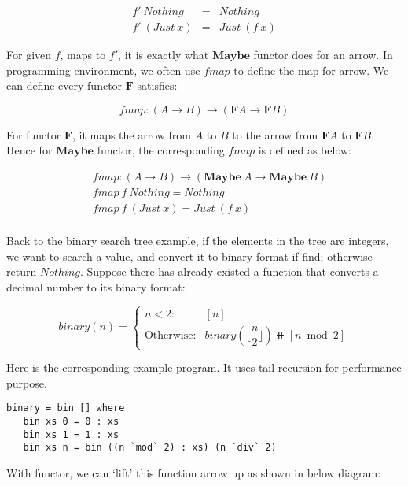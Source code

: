 \documentclass{article}
\begin{document}
\begin{example}
\[
\begin{array}{lcl}
f'\ Nothing & = & Nothing \\
f'\ (Just\ x) & = & Just\ (f\ x)
\end{array}
\]

For given $f$, maps to $f'$, it is exactly what $\mathbf{Maybe}$ functor does for an arrow. In programming environment, we often use $fmap$ to define the map for arrow. We can define every functor $\mathbf{F}$ satisfies:

\[
fmap : (A \to B) \to (\mathbf{F} A \to \mathbf{F} B)
\]

For functor $\mathbf{F}$, it maps the arrow from $A$ to $B$ to the arrow from $\mathbf{F} A$ to $\mathbf{F} B$. Hence for $\mathbf{Maybe}$ functor, the corresponding $fmap$ is defined as below:

\[
\begin{array}{l}
\quad    fmap : (A \to B) \to (\mathbf{Maybe}\ A \to \mathbf{Maybe}\ B) \\
\quad    fmap\ f\ Nothing = Nothing \\
\quad    fmap\ f\ (Just\ x) = Just\ (f\ x) \\
\end{array}
\]

Back to the binary search tree example, if the elements in the tree are integers, we want to search a value, and convert it to binary format if find; otherwise return $Nothing$. Suppose there has already existed a function that converts a decimal number to its binary format:

\[
binary(n) = \begin{cases}
n < 2: & [n] \\
\text{Otherwise}: & binary(\lfloor\dfrac{n}{2}\rfloor)\doubleplus[n \bmod 2]
\end{cases}
\]

Here is the corresponding example program. It uses tail recursion for performance purpose.

\lstset{frame=single}
\begin{lstlisting}[style=Haskell]
binary = bin [] where
   bin xs 0 = 0 : xs
   bin xs 1 = 1 : xs
   bin xs n = bin ((n `mod` 2) : xs) (n `div` 2)
\end{lstlisting}

With functor, we can `lift' this function arrow up as shown in below diagram:

\begin{center}
\end{center}


\end{example}
\end{document}
